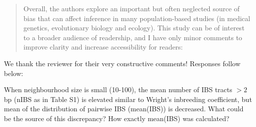 \begin{quote}
    Overall, the
    authors explore an important but often neglected source of bias that can
    affect inference in many population-based studies (in medical genetics,
    evolutionary biology and ecology). This study can be of interest to a
    broader audience of readership, and I have only minor comments to improve
    clarity and increase accessibility for readers:
\end{quote}


We thank the reviewer for their very constructive comments!
Responses follow below:

\begin{point}{}
    When neighbourhood size is small (10-100), the mean number of IBS tracts ${}>2$bp (nIBS as in Table S1) is elevated similar to Wright's inbreeding coefficient, but mean of the distribution of pairwise IBS (mean(IBS)) is decreased. What could be the source of this discrepancy? How exactly mean(IBS) was calculated?
\end{point}

